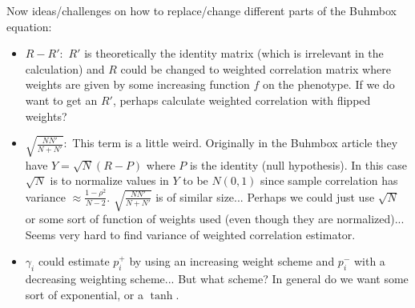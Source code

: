 \documentclass[11pt]{hw-template}
\begin{document}
Now ideas/challenges on how to replace/change different parts of the Buhmbox equation:
\begin{itemize}
  \item $R- R':$ $R'$ is theoretically the identity matrix (which is irrelevant in the calculation) and
  $R$ could be changed to weighted correlation matrix where weights are given by some increasing function $f$
  on the phenotype. If we do want to get an $R'$, perhaps calculate weighted correlation with flipped weights?
  
  \item $\sqrt{\frac{NN'}{N+N'}}:$ This term is a little weird. Originally in the Buhmbox article they have $Y = \sqrt{N}(R - P)$ where $P$ is the identity (null hypothesis).
  In this case $\sqrt{N}$ is to normalize values in $Y$ to be $N(0, 1)$ since sample correlation has variance $\approx \frac{1 - \rho^2}{N-2}$. $\sqrt{\frac{NN'}{N+N'}}$ is of similar size...
  Perhaps we could just use $\sqrt{N}$ or some sort of function of weights used (even though they are normalized)... Seems very hard to find variance of weighted correlation estimator.
  
  \item $\gamma_i$ could estimate $p_i^+$ by using an increasing weight scheme and $p_i^-$ with a decreasing weighting scheme... But what scheme? In general do we want some sort of exponential, or
  a $\tanh$.
\end{itemize}
\end{document}
